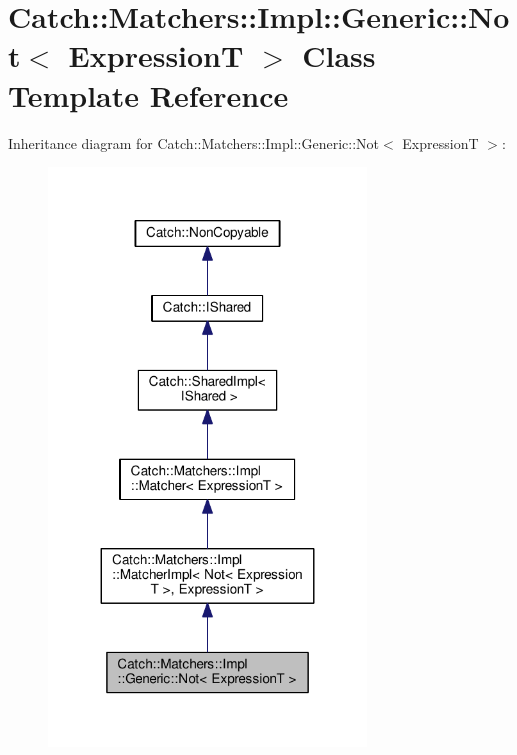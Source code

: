 \hypertarget{classCatch_1_1Matchers_1_1Impl_1_1Generic_1_1Not}{}\section{Catch\+:\+:Matchers\+:\+:Impl\+:\+:Generic\+:\+:Not$<$ ExpressionT $>$ Class Template Reference}
\label{classCatch_1_1Matchers_1_1Impl_1_1Generic_1_1Not}


Inheritance diagram for Catch\+:\+:Matchers\+:\+:Impl\+:\+:Generic\+:\+:Not$<$ ExpressionT $>$\+:
\nopagebreak
\begin{figure}[H]
\begin{center}
\leavevmode
\includegraphics[width=239pt]{classCatch_1_1Matchers_1_1Impl_1_1Generic_1_1Not__inherit__graph}
\end{center}
\end{figure}


